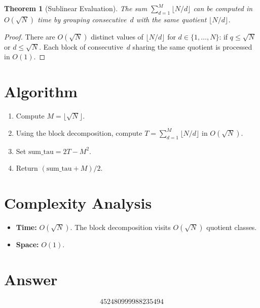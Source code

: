 \documentclass[11pt]{article}
\newtheorem{theorem}{Theorem}
\begin{document}
\begin{theorem}[Sublinear Evaluation]
The sum $\sum_{d=1}^{M}\lfloor N/d\rfloor$ can be computed in $O(\sqrt{N})$ time by grouping consecutive~$d$ with the same quotient $\lfloor N/d\rfloor$.
\end{theorem}

\begin{proof}
There are $O(\sqrt{N})$ distinct values of $\lfloor N/d\rfloor$ for $d \in \{1,\ldots,N\}$: if $q \le \sqrt{N}$ or $d \le \sqrt{N}$. Each block of consecutive~$d$ sharing the same quotient is processed in $O(1)$.
\end{proof}

\section{Algorithm}

\begin{enumerate}
\item Compute $M = \lfloor\sqrt{N}\rfloor$.
\item Using the block decomposition, compute $T = \sum_{d=1}^{M}\lfloor N/d\rfloor$ in $O(\sqrt{N})$.
\item Set $\mathrm{sum\_tau} = 2T - M^2$.
\item Return $(\mathrm{sum\_tau} + M)/2$.
\end{enumerate}

\section{Complexity Analysis}

\begin{itemize}
\item \textbf{Time:} $O(\sqrt{N})$. The block decomposition visits $O(\sqrt{N})$ quotient classes.
\item \textbf{Space:} $O(1)$.
\end{itemize}

\section{Answer}

\[
\boxed{452480999988235494}
\]
\end{document}
